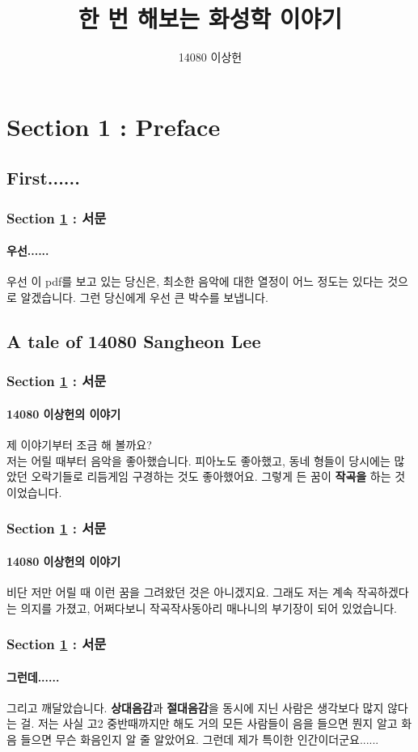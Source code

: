 \documentclass{beamer}
\begin{document}
	
	\begin{frame}
		\title{한 번 해보는 화성학 이야기}
		\author{14080 이상헌}
		\date{}
		\titlepage
	\end{frame}
	

	\section{Section 1 : Preface}\label{sec:preface}%
	\subsection{First......}
	\begin{frame}
		\frametitle{Section \ref{sec:preface} : 서문}
		\framesubtitle{우선......}
		우선 이 pdf를 보고 있는 당신은, 최소한 음악에 대한 열정이 어느 정도는 있다는 것으로 알겠습니다. 그런 당신에게 우선 큰 박수를 보냅니다.
	\end{frame}
	
	\subsection{A tale of 14080 Sangheon Lee}
	\begin{frame}
		\frametitle{Section \ref{sec:preface} : 서문}
		\framesubtitle{14080 이상헌의 이야기}
		제 이야기부터 조금 해 볼까요?\\
		저는 어릴 때부터 음악을 좋아했습니다. 피아노도 좋아했고, 동네 형들이 당시에는 많았던 오락기들로 리듬게임 구경하는 것도 좋아했어요. 그렇게 든 꿈이 {\bf 작곡을} 하는 것이었습니다. 
	\end{frame}
	
	\begin{frame}
		\frametitle{Section \ref{sec:preface} : 서문}
		\framesubtitle{14080 이상헌의 이야기}
		비단 저만 어릴 때 이런 꿈을 그려왔던 것은 아니겠지요. 그래도 저는 계속 작곡하겠다는 의지를 가졌고, 어쩌다보니 작곡작사동아리 매나니의 부기장이 되어 있었습니다.
	\end{frame}
	
	\begin{frame}
		\frametitle{Section \ref{sec:preface} : 서문}
		\framesubtitle{그런데......}
		그리고 깨달았습니다. {\bf 상대음감}과 {\bf 절대음감}을 동시에 지닌 사람은 생각보다 많지 않다는 걸. 저는 사실 고2 중반때까지만 해도 거의 모든 사람들이 음을 들으면 뭔지 알고 화음 들으면 무슨 화음인지 알 줄 알았어요. 그런데 제가 특이한 인간이더군요......
	\end{frame}
	
\end{document}
